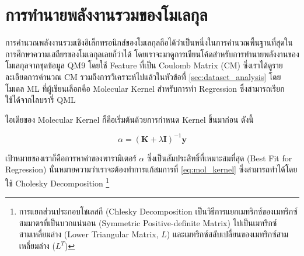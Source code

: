 
\section{การทำนายพลังงานรวมของโมเลกุล}
\label{sec:pred_tot_ener}

การคำนวณพลังงานรวมเชิงอิเล็กทรอนิกส์ของโมเลกุลถือได้ว่าเป็นหนึ่งในการคำนวณพื้นฐานที่สุดในการศึกษาความเสถียรของโมเลกุลเลยก็ว่าได้
โดยเราจะมาดูการเขียนโค้ดสำหรับการทำนายพลังงานของโมเลกุลจากชุดข้อมูล QM9 โดยใช้ Feature ที่เป็น Coulomb Matrix (CM) 
ซึ่งเราได้ดูรายละเอียดการคำนวณ CM รวมถึงการวิเคราะห์ไปแล้วในหัวข้อที่ \ref{sec:dataset_analysis} โดยโมเดล ML ที่ผู้เขียนเลือกคือ
Molecular Kernel สำหรับการทำ Regression ซึ่งสามารถเรียกใช้ได้จากไลบรารี่ QML

ไอเดียของ Molecular Kernel ก็คือเริ่มต้นด้วยการกำหนด Kernel ขึ้นมาก่อน ดังนี้

\begin{equation}\label{eq:mol_kernel}
    \alpha = (\mathbf{K} + \lambda\mathbf{I} ) ^{-1} \mathbf{y}
\end{equation}

\noindent เป้าหมายของเราก็คือการหาค่าของพารามิเตอร์ $\alpha$ ซึ่งเป็นสัมประสิทธิ์ที่เหมาะสมที่สุด (Best Fit for Regression) 
นั่นหมายความว่าเราจะต้องทำการแก้สมการที่ \ref{eq:mol_kernel} ซึ่งสามารถทำได้โดยใช้ Cholesky Decomposition%
\footnote{การแยกส่วนประกอบโชเลสกี (Chlesky Decomposition เป็นวิธีการแยกเมทริกซ์ของเมทริกซ์สมมาตรที่เป็นบวกแน่นอน (Symmetric 
Positive-definite Matrix) ไปเป็นเมทริกซ์สามเหลี่ยมล่าง (Lower Triangular Matrix, $L$) และเมทริกซ์สลับเปลี่ยนของเมทริกซ์สาม%
เหลี่ยมล่าง ($L^{T}$)}

